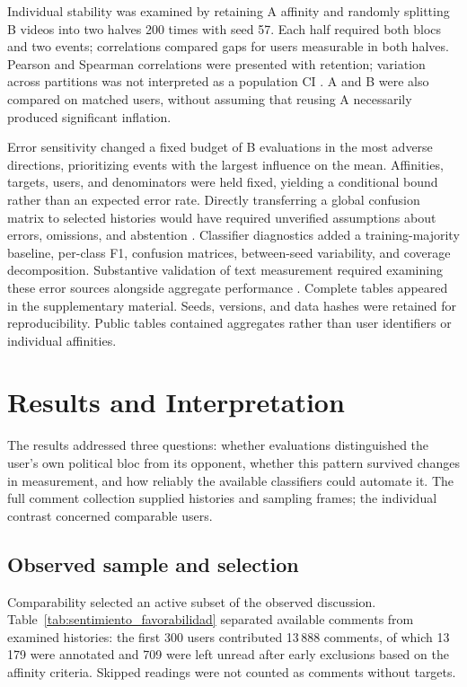 \documentclass[conference,letterpaper]{IEEEtran}
\begin{document}
Individual stability was examined by retaining A affinity and randomly splitting B videos into two halves 200 times with seed 57. Each half required both blocs and two events; correlations compared gaps for users measurable in both halves. Pearson and Spearman correlations were presented with retention; variation across partitions was not interpreted as a population CI \cite{Pronk2022SplitHalf}. A and B were also compared on matched users, without assuming that reusing A necessarily produced significant inflation.

Error sensitivity changed a fixed budget of B evaluations in the most adverse directions, prioritizing events with the largest influence on the mean. Affinities, targets, users, and denominators were held fixed, yielding a conditional bound rather than an expected error rate. Directly transferring a global confusion matrix to selected histories would have required unverified assumptions about errors, omissions, and abstention \cite{Egami2023Surrogates}. Classifier diagnostics added a training-majority baseline, per-class F1, confusion matrices, between-seed variability, and coverage decomposition. Substantive validation of text measurement required examining these error sources alongside aggregate performance \cite{GrimmerStewart2013}. Complete tables appeared in the supplementary material. Seeds, versions, and data hashes were retained for reproducibility. Public tables contained aggregates rather than user identifiers or individual affinities.

\section{Results and Interpretation}

The results addressed three questions: whether evaluations distinguished the user's own political bloc 
from its opponent, whether this pattern survived changes in measurement, and how reliably the 
available classifiers could automate it. The full comment collection supplied histories and 
sampling frames; the individual contrast concerned comparable users.

\subsection{Observed sample and selection}
Comparability selected an active subset of the observed discussion. Table~\ref{tab:sentimiento_favorabilidad}
separated available comments from examined histories: the first 300 users contributed 13\,888 comments,
of which 13\,179 were annotated and 709 were left unread after early exclusions based on the affinity criteria. Skipped readings were not counted as comments without targets.
\end{document}
